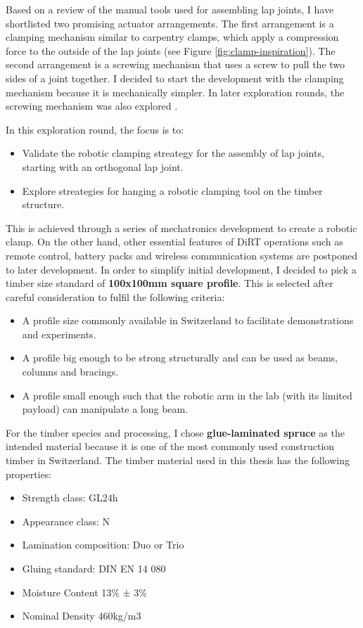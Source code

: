 Based on a review of the manual tools used for assembling lap joints, I have shortlisted two promising actuator arrangements. The first arrangement is a clamping mechanism similar to carpentry clamps, which apply a compression force to the outside of the lap joints (see Figure \ref{fig:clamp-inspiration}). The second arrangement is a screwing mechanism that uses a screw to pull the two sides of a joint together. I decided to start the development with the clamping mechanism because it is mechanically simpler. In later exploration rounds, the screwing mechanism was also explored .

In this exploration round, the focus is to:
\begin{itemize}
    \item Validate the robotic clamping streategy for the assembly of lap joints, starting with an orthogonal lap joint.
    \item Explore streategies for hanging a robotic clamping tool on the timber structure.
\end{itemize}

This is achieved through a series of mechatronics development to create a robotic clamp. On the other hand, other essential features of DiRT operations such as remote control, battery packs and wireless communication systems are postponed to later development.
In order to simplify initial development, I decided to pick a timber size standard of \textbf{100x100mm square profile}. This is selected after careful consideration to fulfil the following criteria:
\begin{itemize}[nosep]
    \item A profile size commonly available in Switzerland to facilitate demonstrations and experiments.
    \item A profile big enough to be strong structurally and can be used as beams, columns and bracings.
    \item A profile small enough such that the robotic arm in the lab (with its limited payload) can manipulate a long beam.
\end{itemize}

For the timber species and processing, I chose \textbf{glue-laminated spruce} as the intended material because it is one of the most commonly used construction timber in Switzerland. The timber material used in this thesis has the following properties:

\begin{itemize}[nosep]
    \item Strength class: GL24h
    \item Appearance class: N
    \item Lamination composition: Duo or Trio
    \item Gluing standard: DIN EN 14 080
    \item Moisture Content 13\% ± 3\%
    \item Nominal Density 460kg/m3
\end{itemize}

